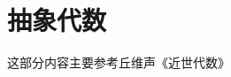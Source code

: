 \newpage
\inmainbodyfalse
\part{抽象代数}\label{抽象代数}
这部分内容主要参考丘维声《近世代数》\cite{丘维声2015近世代数}



\inmainbodytrue






